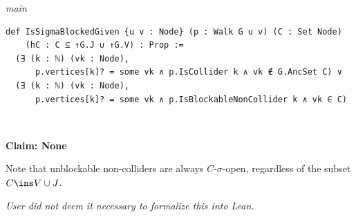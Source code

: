 {\small\textit{main}}
\begin{verbatim}
def IsSigmaBlockedGiven {u v : Node} (p : Walk G u v) (C : Set Node)
    (hC : C ⊆ ↑G.J ∪ ↑G.V) : Prop :=
  (∃ (k : ℕ) (vk : Node),
      p.vertices[k]? = some vk ∧ p.IsCollider k ∧ vk ∉ G.AncSet C) ∨
  (∃ (k : ℕ) (vk : Node),
      p.vertices[k]? = some vk ∧ p.IsBlockableNonCollider k ∧ vk ∈ C)
\end{verbatim}
~%

\vspace{\appendixNotesGap}

\noindent\textbf{Claim: None}\par\smallskip
{\appendixTexSize
\def\rowref{claim\_3\_21}
\label{claim_3_21}

Note that unblockable non-colliders are always $C$-$\sigma$-open, regardless of the subset $C \ins V \cup J$.
\par}
\smallskip
\textit{User did not deem it necessary to formalize this into Lean.}
~%

\vspace{\appendixNotesGap}

